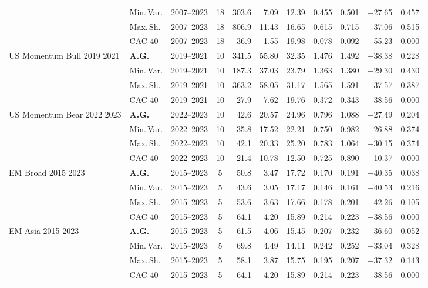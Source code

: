 \begin{longtable}{p{2.6cm} l c c r r r r r r r}
 & Min.\,Var. & 2007--2023 & 18 & 303.6 & 7.09 & 12.39 & 0.455 & 0.501 & $-$27.65 & 0.457 \\
 & Max.\,Sh. & 2007--2023 & 18 & 806.9 & 11.43 & 16.65 & 0.615 & 0.715 & $-$37.06 & 0.515 \\
 & CAC 40 & 2007--2023 & 18 & 36.9 & 1.55 & 19.98 & 0.078 & 0.092 & $-$55.23 & 0.000 \\
\midrule
US Momentum Bull 2019 2021 & \textbf{A.G.} & 2019--2021 & 10 & 341.5 & 55.80 & 32.35 & 1.476 & 1.492 & $-$38.38 & 0.228 \\
 & Min.\,Var. & 2019--2021 & 10 & 187.3 & 37.03 & 23.79 & 1.363 & 1.380 & $-$29.30 & 0.430 \\
 & Max.\,Sh. & 2019--2021 & 10 & 363.2 & 58.05 & 31.17 & 1.565 & 1.591 & $-$37.57 & 0.387 \\
 & CAC 40 & 2019--2021 & 10 & 27.9 & 7.62 & 19.76 & 0.372 & 0.343 & $-$38.56 & 0.000 \\
\midrule
US Momentum Bear 2022 2023 & \textbf{A.G.} & 2022--2023 & 10 & 42.6 & 20.57 & 24.96 & 0.796 & 1.088 & $-$27.49 & 0.204 \\
 & Min.\,Var. & 2022--2023 & 10 & 35.8 & 17.52 & 22.21 & 0.750 & 0.982 & $-$26.88 & 0.374 \\
 & Max.\,Sh. & 2022--2023 & 10 & 42.1 & 20.33 & 25.20 & 0.783 & 1.064 & $-$30.15 & 0.374 \\
 & CAC 40 & 2022--2023 & 10 & 21.4 & 10.78 & 12.50 & 0.725 & 0.890 & $-$10.37 & 0.000 \\
\midrule
EM Broad 2015 2023 & \textbf{A.G.} & 2015--2023 & 5 & 50.8 & 3.47 & 17.72 & 0.170 & 0.191 & $-$40.35 & 0.038 \\
 & Min.\,Var. & 2015--2023 & 5 & 43.6 & 3.05 & 17.17 & 0.146 & 0.161 & $-$40.53 & 0.216 \\
 & Max.\,Sh. & 2015--2023 & 5 & 53.6 & 3.63 & 17.66 & 0.178 & 0.201 & $-$42.26 & 0.105 \\
 & CAC 40 & 2015--2023 & 5 & 64.1 & 4.20 & 15.89 & 0.214 & 0.223 & $-$38.56 & 0.000 \\
\midrule
EM Asia 2015 2023 & \textbf{A.G.} & 2015--2023 & 5 & 61.5 & 4.06 & 15.45 & 0.207 & 0.232 & $-$36.60 & 0.052 \\
 & Min.\,Var. & 2015--2023 & 5 & 69.8 & 4.49 & 14.11 & 0.242 & 0.252 & $-$33.04 & 0.328 \\
 & Max.\,Sh. & 2015--2023 & 5 & 58.1 & 3.87 & 15.75 & 0.195 & 0.207 & $-$37.32 & 0.143 \\
 & CAC 40 & 2015--2023 & 5 & 64.1 & 4.20 & 15.89 & 0.214 & 0.223 & $-$38.56 & 0.000 \\

\end{longtable}
